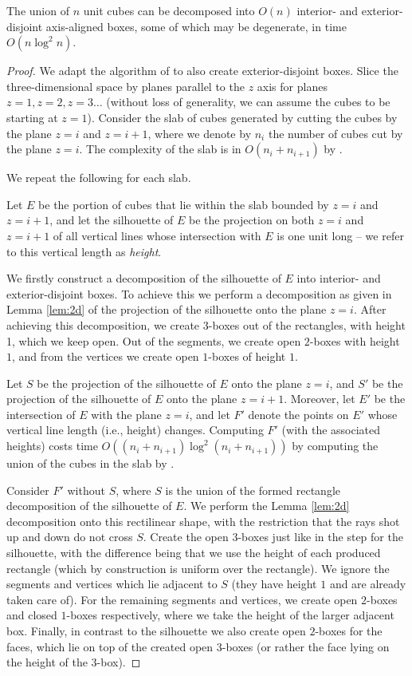 \begin{lemma}
	The union of $n$ unit cubes can be decomposed into $O(n)$ interior- and exterior-disjoint axis-aligned boxes, some of which may be degenerate, in time $O(n \log^2 n)$.
\end{lemma}
\begin{proof}
We adapt the algorithm of \cite{DBLP:journals/dcg/ChewDEK99} to also create exterior-disjoint boxes.
Slice the three-dimensional space by planes parallel to the $z$ axis for planes $z=1, z=2, z=3 \dots$ (without loss of generality, we can assume the cubes to be starting at $z=1$).
Consider the slab of cubes generated by cutting the cubes by  the plane $z=i$ and $z=i+1$, where we 
denote by $n_i$ the number of cubes cut by the plane $z=i$. The complexity of the slab is in $O(n_i+n_{i+1})$ by \cite{DBLP:journals/dcg/BoissonnatSTY98}.

We repeat the following for each slab.

Let $E$ be the portion of cubes that lie within the slab bounded by $z=i$ and $z=i+1$, and let the 
silhouette of $E$ be the projection on both $z=i$ and $z=i+1$ of all vertical lines whose intersection with
	$E$ is one unit long -- we refer to this vertical length as \emph{height}.

We firstly construct a decomposition of the silhouette of $E$ into interior- and exterior-disjoint boxes.
To achieve this we perform a decomposition as given in Lemma \ref{lem:2d} of the projection of the silhouette onto the plane $z=i$.
After achieving this decomposition, we create $3$-boxes out of the rectangles, with height 1, which we keep open.
Out of the segments, we create open $2$-boxes with height $1$, and from the vertices we create open $1$-boxes of height $1$.

Let $S$ be the projection of the silhouette of $E$ onto the plane $z=i$, and $S'$ be the projection of the silhouette of $E$ onto the plane $z=i+1$.
	Moreover, let $E'$ be the intersection of $E$ with the plane $z=i$, and let $F'$ denote the points on $E'$ whose vertical line length (i.e., height) changes.
	Computing $F'$ (with the associated heights) costs time $O((n_i+n_{i+1}) \log^2 (n_i+ n_{i+1}))$ by computing the union of the cubes in the slab by \cite{AgarwalS21}.


Consider $F'$ without $S$, where $S$ is the union of the formed rectangle decomposition of the silhouette of $E$.
We perform the Lemma \ref{lem:2d} decomposition onto this rectilinear shape, with the restriction that the rays shot up and down do not cross 
	$S$. Create the open $3$-boxes just like in the step for the silhouette, with the difference being that we use the height of each produced rectangle (which by construction is uniform over the rectangle).
We ignore the segments and vertices which lie adjacent to $S$ (they have height $1$ and are already taken care of).
For the remaining segments and vertices, we create open $2$-boxes and closed $1$-boxes respectively, where we take the height of the larger adjacent box. Finally, in contrast to the silhouette we also create open $2$-boxes for the faces, which lie on top of the created open $3$-boxes (or rather the face lying on the height of the $3$-box).


\end{proof}
